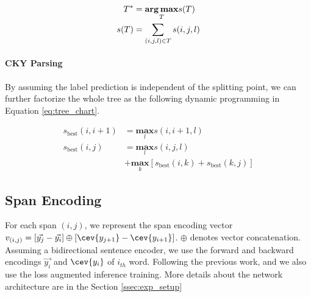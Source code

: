 \begin{equation}
  \label{eq:tree_factorize}
 \begin{aligned} T^{*}  & = \underset{T}{\textbf{arg\,max}} s(T)     \\ s(T)
                        & = \sum_{(i,j,l) \in T} s(i,j,l)
\end{aligned}
\end{equation}

\paragraph{CKY Parsing} By assuming the label prediction is
independent of the splitting point, we can further factorize the whole
tree as the following dynamic programming in Equation \ref{eq:tree_chart}.

\begin{equation}
  \label{eq:tree_chart}
\begin{aligned}
      s_{\text{best}}(i, i+1) & = \underset{l}{\textbf{max}} s(i,i+1, l) \\
      s_{\text{best}}(i, j) & = \underset{l}{\textbf{max}} s(i,j, l)
      \\ & + \underset{k}{\textbf{max}}[ s_{\text{best}}(i,k) +
      s_{\text{best}}(k,j) ]
\end{aligned}
\end{equation}

\subsection{Span Encoding}
\label{ssec:phr:span}

For each span $(i,j)$, we represent the span encoding vector
$v_{(i,j)} = [\vec{y_{j}} - \vec{y_{i}}] \oplus [\cev{y_{j+1}} -
\cev{y_{i+1}}] $. $\oplus$ denotes vector concatenation. Assuming a
bidirectional sentence encoder, we use the forward and backward
encodings $\vec{y_{i}}$ and $\cev{y_{i}}$ of $i_{th}$ word. Following
the previous work, and we also use the loss augmented inference
training. More details about the network
architecture are in the Section \ref{ssec:exp_setup}


